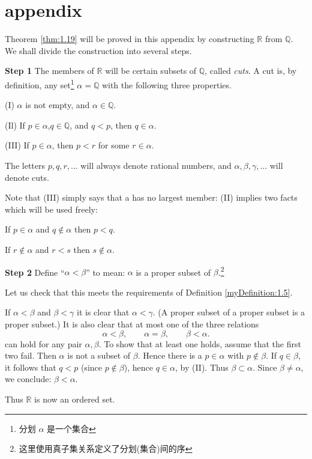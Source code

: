 \section*{appendix}
Theorem \ref{thm:1.19} will be proved in this appendix by constructing $\mathbb{R}$ from $\mathbb{Q}$. We
shall divide the construction into several steps.

\textbf{Step 1} 
The members of $\mathbb{R}$ will be certain subsets of $\mathbb{Q}$, called \emph{cuts}. A cut is,
by definition, any set\footnote{分划 $\alpha$ 是一个集合} $\alpha = \mathbb{Q}$ with the following three properties.

(I) $\alpha$ is not empty, and $\alpha \in \mathbb{Q}$.

(Il) If $p\in \alpha$,$q \in \mathbb{Q}$, and $q <p$, then $q \in \alpha$.

(III) If $p \in \alpha$, then $p <r$ for some $r\in \alpha$.

The letters $p, q, r, ...$ will always denote rational numbers, and $\alpha, \beta, \gamma, ...$
will denote cuts.

Note that (III) simply says that a has no largest member: (II) implies two facts which will be used freely:

If $p\in\alpha$ and $q\not\in\alpha$ then $p<q$.

If $r\not\in \alpha$ and $r<s$ then $s\not\in \alpha$.

\textbf{Step 2}
Define ``$\alpha < \beta$'' to mean: $\alpha$ is a proper subset of $\beta$.\footnote{这里使用真子集关系定义了分划(集合)间的序}

Let us check that this meets the requirements of Definition \ref{myDefinition:1.5}.

If $\alpha < \beta$ and $\beta < \gamma$ it is clear that $\alpha < \gamma$. (A proper subset of a proper subset is a proper subset.) It is also clear that at most one of the three relations
\begin{equation*}
    \alpha < \beta, \qquad
    \alpha = \beta, \qquad
    \beta < \alpha.
\end{equation*}
can hold for any pair $\alpha, \beta$. To show that at least one holds, assume that the first two fail. Then $\alpha$ is not a subset of $\beta$. Hence there is a $p \in \alpha$ with $p \not\in \beta$. If $q \in \beta$, it follows that $q <p$ (since $p \not\in \beta$), hence $q \in \alpha$, by (II). Thus $\beta \subset \alpha$. Since $\beta \neq \alpha$, we conclude: $\beta < \alpha$.

Thus $\mathbb{R}$ is now an ordered set.

